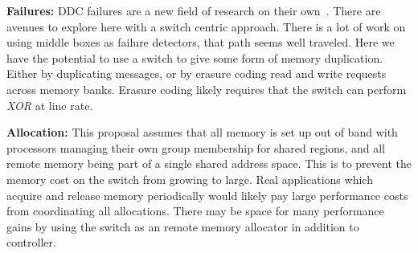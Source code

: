 \textbf{Failures:}
DDC failures are a new field of research on their
own~\cite{amanda-hotnets}. There are avenues to explore here with a
switch centric approach. There is a lot of work on using middle boxes
as failure detectors, that path seems well traveled. Here we have the
potential to use a switch to give some form of memory duplication.
Either by duplicating messages, or by erasure coding read and write
requests across memory banks. Erasure coding likely requires that the
switch can perform \textit{XOR} at line rate.

\textbf{Allocation:}
This proposal assumes that all memory is set up out of band with
processors managing their own group membership for shared regions, and
all remote memory being part of a single shared address space. This is
to prevent the memory cost on the switch from growing to large. Real
applications which acquire and release memory periodically would likely
pay large performance costs from coordinating all allocations. There
may be space for many performance gains by using the switch as an
remote memory allocator in addition to controller.

\pagebreak


